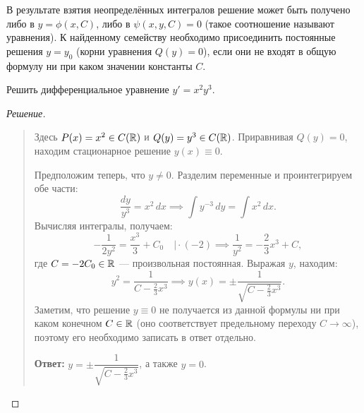 В результате взятия неопределённых интегралов решение может быть получено либо
в  $y = \phi(x, C)$, либо в 
$\psi(x, y, C) = 0$ (такое соотношение называют 
уравнения). К найденному семейству необходимо присоединить постоянные решения
$y = y_0$ (корни уравнения $Q(y) = 0$), если они не входят в общую формулу ни
при каком значении константы $C$.

\begin{example}
    Решить дифференциальное уравнение $y' = x^2 y^3$.

    \begin{proof}[Решение]~\\
        \begin{quote}
            Здесь $P(x) = x^2 \in C(\mathbb{R})$ и $Q(y) = y^3 \in C(\mathbb{R})$.
            Приравнивая $Q(y) = 0$, находим стационарное решение $y(x) \equiv 0$.

            Предположим теперь, что $y \neq 0$. Разделим переменные и
            проинтегрируем обе части:
            \[
                \frac{dy}{y^3} = x^2 \, dx \implies
                \int y^{-3} \, dy = \int x^2 \, dx.
            \]
            Вычисляя интегралы, получаем:
            \[
                -\frac{1}{2y^2} = \frac{x^3}{3} + C_0 \quad \Big| \cdot (-2)
                \implies \frac{1}{y^2} = -\frac{2}{3} x^3 + C,
            \]
            где $C = -2C_0 \in \mathbb{R}$ — произвольная постоянная. Выражая $y$,
            находим:
            \[
                y^2 = \frac{1}{C - \frac{2}{3} x^3} \implies
                y(x) = \pm \frac{1}{\sqrt{C - \frac{2}{3} x^3}}.
            \]
            Заметим, что решение $y \equiv 0$ не получается из данной формулы
            ни при каком конечном $C \in \mathbb{R}$ (оно соответствует предельному
            переходу $C \to \infty$), поэтому его необходимо записать в ответ
            отдельно.

            \textbf{Ответ:} $y = \pm \dfrac{1}{\sqrt{C - \frac{2}{3} x^3}}$, а
            также $y = 0$.
        \end{quote}
    \end{proof}
\end{example}


